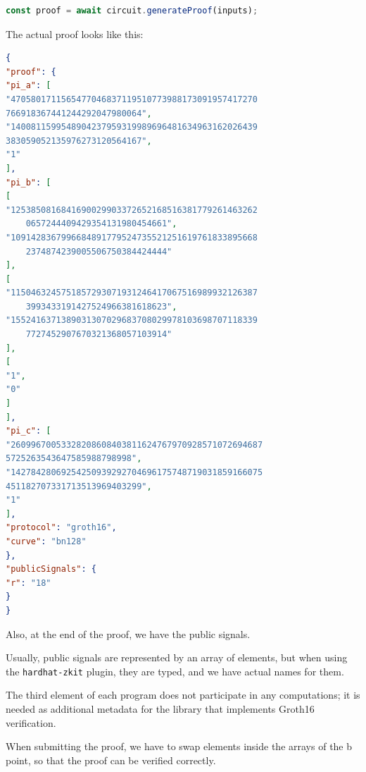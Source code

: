 \documentclass[../../book.tex]{subfiles}
\begin{document}
\begin{lstlisting}[language=TypeScript,numbers=none]
const proof = await circuit.generateProof(inputs);
\end{lstlisting}

The actual proof looks like this:
\begin{center}
    \begin{tcolorbox}[enhanced,
        width=0.925\textwidth,
        title=\textbf{proof.json},
        coltitle=gray!25!black,
        attach boxed title to top center={yshift=-2mm,yshifttext=-1mm},
        boxed title style={size=small,colframe=gray!75!black,
        colback=purple!30!white,boxrule=1pt},
        top=-0.35cm,
        bottom=-0.35cm]
        \begin{lstlisting}[language=JSON,numbers=none,basicstyle=\ttfamily\scriptsize]
{
"proof": {
"pi_a": [
"4705801711565477046837119510773988173091957417270
766918367441244292047980064",
"1400811599548904237959319989696481634963162026439
383059052135976273120564167",
"1"
],
"pi_b": [
[
"1253850816841690029903372652168516381779261463262
    0657244409429354131980454661",
"1091428367996684891779524735521251619761833895668
    2374874239005506750384424444"
],
[
"1150463245751857293071931246417067516989932126387
    3993433191427524966381618623",
"1552416371389031307029683708029978103698707118339
    7727452907670321368057103914"
],
[
"1",
"0"
]
],
"pi_c": [
"26099670053328208608403811624767970928571072694687
5725263543647585988798998",
"14278428069254250939292704696175748719031859166075
451182707331713513969403299",
"1"
],
"protocol": "groth16",
"curve": "bn128"
},
"publicSignals": {
"r": "18"
}
}
        \end{lstlisting}
    \end{tcolorbox}
\end{center}

Also, at the end of the proof, we have the public signals.

\begin{remark}
    Usually, public signals are represented by an array of elements, but when using the \texttt{hardhat-zkit} plugin,
    they are typed, and we have actual names for them.
\end{remark}

The third element of each program does not participate in any computations; it is needed as additional metadata for the library that implements Groth16 verification.

\begin{remark}
    When submitting the proof, we have to swap elements inside the arrays of the b point, so that the proof can be verified correctly.
\end{remark}
\end{document}
